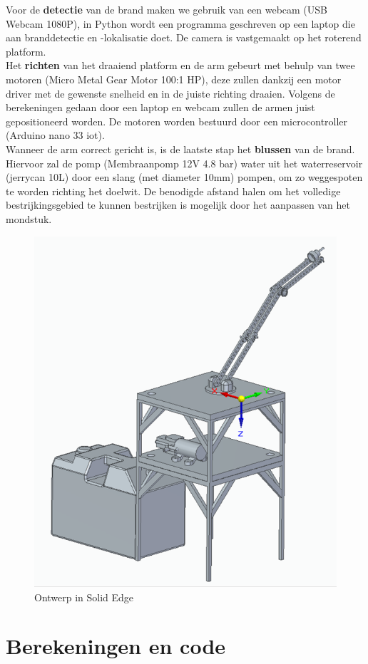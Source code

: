 \documentclass[kulak]{kulakarticle} %
\begin{document}
	Voor de \textbf{detectie} van de brand maken we gebruik van een webcam (USB Webcam 1080P), in Python wordt een programma geschreven op een laptop die aan branddetectie en -lokalisatie doet. De camera is vastgemaakt op het roterend platform. \\
	
	Het \textbf{richten} van het draaiend platform en de arm gebeurt met behulp van twee motoren (Micro Metal Gear Motor 100:1 HP), deze zullen dankzij een motor driver met de gewenste snelheid en in de juiste richting draaien. Volgens de berekeningen gedaan door een laptop en webcam zullen de armen juist gepositioneerd worden. De motoren worden bestuurd door een microcontroller (Arduino nano 33 iot). \\
	
	Wanneer de arm correct gericht is, is de laatste stap het \textbf{blussen} van de brand. Hiervoor zal de pomp (Membraanpomp 12V 4.8 bar) water uit het waterreservoir (jerrycan 10L) door een slang (met diameter 10mm) pompen, om zo weggespoten te worden richting het doelwit. De benodigde afstand halen om het volledige bestrijkingsgebied te kunnen bestrijken is mogelijk door het aanpassen van het mondstuk.\\

	\begin{figure} [!h]
		\centering
		\includegraphics[width = .6 \textwidth]{Solid Edge Assembly foto}
		\caption{Ontwerp in Solid Edge}
		\label{ontwerp}
	\end{figure}



\section{Berekeningen en code}
\end{document}
